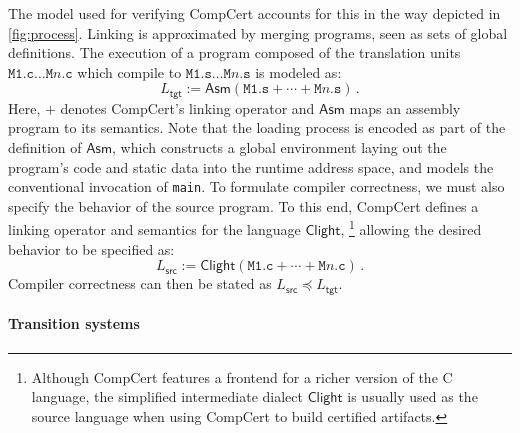 \documentclass[sigplan,10pt,review]{acmart}
\newcommand{\kw}[1]{\ensuremath{ \mathsf{#1} }}
\newcommand{\refby}{\preceq}
\newcommand{\opt}[2]{#1}
\newcommand{\opt}[2]{#2}
\begin{document}
The model used for verifying CompCert accounts for this
\opt{in the way depicted in \autoref{fig:process}.}%
    {in the following way.}
Linking is approximated by
merging programs, seen as sets of global definitions.
The execution
of a program composed of the translation units
$\texttt{M1.c} \ldots \texttt{M$n$.c}$
which compile to
$\texttt{M1.s} \ldots \texttt{M$n$.s}$
is modeled as:
\[
    L_\kw{tgt} :=
    \kw{Asm}(\texttt{M1.s} +
             \cdots +
             \texttt{M$n$.s}) \,.
\]
Here,
$+$ denotes CompCert's linking operator and
$\kw{Asm}$ maps an assembly program to its semantics.
Note that the loading process is encoded
as part of the definition of $\kw{Asm}$,
which constructs a global environment
laying out the program's code and static data
into the runtime address space,
and models the conventional invocation of \texttt{main}.
To formulate compiler correctness,
we must also specify the behavior of the source program.
To this end,
CompCert defines a linking operator
and semantics
for the language $\kw{Clight}$,%
\footnote{
  Although CompCert features a frontend for a richer version
  of the C language,
  the simplified intermediate dialect \kw{Clight}
  is usually used as the source language
  when using CompCert to build certified artifacts.
}
allowing the desired behavior to be specified as:
\[
    L_\kw{src} :=
    \kw{Clight}(\texttt{M1.c} + \cdots + \texttt{M$n$.c}) \,.
\]
Compiler correctness
can then be stated as $L_\kw{src} \refby L_\kw{tgt}$.

\paragraph{Transition systems} %
\end{document}
